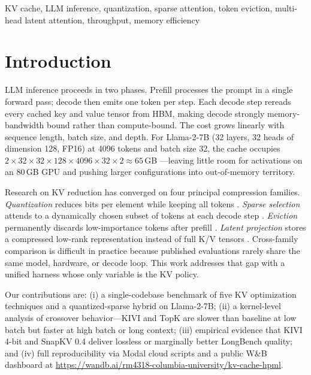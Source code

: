 \documentclass[conference]{IEEEtran}
\begin{document}
\begin{IEEEkeywords}
KV cache, LLM inference, quantization, sparse attention, token eviction,
multi-head latent attention, throughput, memory efficiency
\end{IEEEkeywords}

\section{Introduction}

LLM inference proceeds in two phases.  Prefill processes the prompt in
a single forward pass; decode then emits one token per step.  Each
decode step rereads every cached key and value tensor from HBM, making
decode strongly memory-bandwidth bound rather than compute-bound.  The
cost grows linearly with sequence length, batch size, and depth.  For
Llama-2-7B \cite{llama2} (32 layers, 32 heads of dimension 128, FP16) at
4096 tokens and batch size 32, the cache occupies
$2\times32\times32\times128\times4096\times32\times2 \approx 65$\,GB
\cite{survey}---leaving little room for activations on an 80\,GB GPU
and pushing larger configurations into out-of-memory territory.

Research on KV reduction has converged on four principal compression
families.  \emph{Quantization} reduces bits per element while keeping
all tokens \cite{kivi,kvquant}.  \emph{Sparse selection} attends to a
dynamically chosen subset of tokens at each decode step
\cite{tokenselect,rocketkv}.  \emph{Eviction} permanently discards
low-importance tokens after prefill \cite{h2o,snapkv,adakv}.
\emph{Latent projection} stores a compressed low-rank representation
instead of full K/V tensors \cite{deepseekv2,transmla}.  Cross-family
comparison is difficult in practice because published evaluations
rarely share the same model, hardware, or decode loop.  This work
addresses that gap with a unified harness whose only variable is the KV
policy.

Our contributions are: (i) a single-codebase benchmark of five KV
optimization techniques and a quantized-sparse hybrid on Llama-2-7B;
(ii) a kernel-level analysis of crossover behavior---KIVI and TopK are
slower than baseline at low batch but faster at high batch or long
context; (iii) empirical evidence that KIVI 4-bit and SnapKV 0.4
deliver lossless or marginally better LongBench quality; and (iv) full
reproducibility via Modal cloud scripts and a public W\&B dashboard at
\url{https://wandb.ai/rm4318-columbia-university/kv-cache-hpml}.
\end{document}
